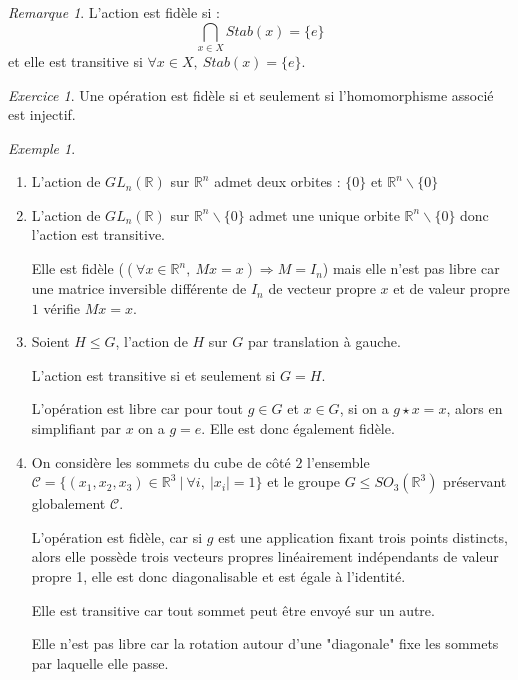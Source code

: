 \documentclass[]{article}
\theoremstyle{remark}
\newtheorem{myrem}{Remarque}
\newtheorem{myexer}{Exercice}
\newtheorem{myexmpl}{Exemple}
\theoremstyle{definition}
\begin{document}
\begin{myrem}
	L'action est fidèle si : $$\bigcap_{x \in X} Stab(x) = \{e\}$$
	et elle est transitive si $\forall x \in X, ~ Stab(x) = \{e\}$.
\end{myrem}

\begin{myexer}
	Une opération est fidèle si et seulement si l'homomorphisme associé est injectif.
\end{myexer}

\begin{myexmpl}
	\leavevmode
	\begin{enumerate}
		\item L'action de $GL_n(\mathbb{R})$ sur  $\mathbb{R}^n$ admet deux orbites : $\{0\}$ et $\mathbb{R}^n \backslash \{0\}$
		
		\item L'action de $GL_n(\mathbb{R})$ sur  $\mathbb{R}^n \backslash \{0\}$ admet une unique orbite $\mathbb{R}^n \backslash \{0\}$ donc l'action est transitive.
		
		Elle est fidèle ($(\forall x \in \mathbb{R}^n, ~ Mx=x) \Longrightarrow M=I_n$) mais elle n'est pas libre car une matrice inversible différente de $I_n$ de vecteur propre $x$ et de valeur propre $1$ vérifie $Mx=x$.
		
		\item Soient $H \leqslant G$, l'action de $H$ sur $G$ par translation à gauche.
		
		L'action est transitive si et seulement si $G = H$.
		
		L'opération est libre car pour tout $g \in G$ et $x \in G$, si on a $g \star x=x$, alors en simplifiant par $x$ on a $g=e$. Elle est donc également fidèle.
		
		\item On considère les sommets du cube de côté $2$ l'ensemble $\mathcal{C}=\{(x_1, x_2, x_3) \in \mathbb{R}^3 ~ | ~ \forall i, ~ |x_i| = 1 \}$ et le groupe $G \leqslant SO_3(\mathbb{R}^3)$ préservant globalement $\mathcal{C}$.
		
		L'opération est fidèle, car si $g$ est une application fixant trois points distincts, alors elle possède trois vecteurs propres linéairement indépendants de valeur propre 1, elle est donc diagonalisable et est égale à l'identité.
		
		Elle est transitive car tout sommet peut être envoyé sur un autre.
		
		Elle n'est pas libre car la rotation autour d'une "diagonale" fixe les sommets par laquelle elle passe.
	\end{enumerate}
\end{myexmpl}
\end{document}
